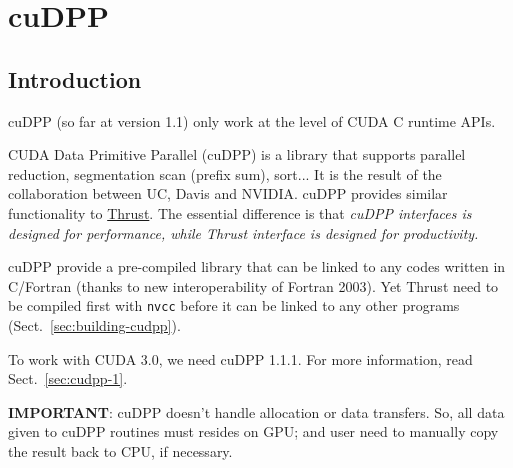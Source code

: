 
\chapter{cuDPP}
\label{chap:cudpp}

\section{Introduction}
\label{sec:introduction-5}

\begin{framed}
  cuDPP (so far at version 1.1) only work at the level of CUDA C
  runtime APIs.
\end{framed}

CUDA Data Primitive Parallel (cuDPP) is a library that supports
parallel reduction, segmentation scan (prefix sum), sort... It is the
result of the collaboration between UC, Davis and NVIDIA. cuDPP
provides similar functionality to \hyperref[chap:thrust]{Thrust}. The
essential difference is that {\it cuDPP interfaces is designed for
performance, while Thrust interface is designed for productivity.}

cuDPP provide a pre-compiled library that can be linked to any codes
written in C/Fortran (thanks to new interoperability of Fortran
2003). Yet Thrust need to be compiled first with \verb!nvcc! before it
can be linked to any other programs (Sect.~\ref{sec:building-cudpp}).

To work with CUDA 3.0, we need cuDPP 1.1.1. For more information, read
Sect.~\ref{sec:cudpp-1}. 

{\bf IMPORTANT}: cuDPP doesn't handle allocation or data
transfers. So, all data given to cuDPP routines must resides on GPU;
and user need to manually copy the result back to CPU, if necessary. 

